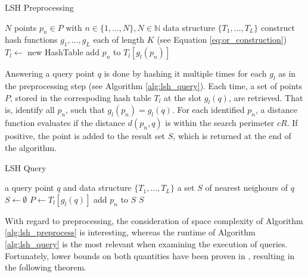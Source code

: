 \begin{algorithm}
    \caption{LSH Preprocessing}
    \label{alg:lsh_preprocess}
    \begin{algorithmic}[1]
        \REQUIRE $N$ points $p_n \in P$ with $n \in \{1, \dots, N\}, N \in \mathbb{N}$
        \ENSURE data structure $\{T_1, \dots, T_L\}$
        \STATE construct hash functions $g_1, \dots, g_L$ each of length $K$ (see Equation \ref{eq:or_construction})
            \STATE $T_l \leftarrow$ new HashTable
                \STATE add $p_n$ to $T_l[g_l(p_n)]$
            \ENDFOR
        \ENDFOR
    \end{algorithmic}
 \end{algorithm}

 Answering a query point $q$ is done by hashing it multiple times for each $g_l$ as in the preprocessing step (see Algorithm \ref{alg:lsh_query}). Each time, a set of points $P$, stored in the correspoding hash table $T_l$ at the slot $g_l(q)$, are retrieved. That is, identify all $p_n$, such that $g_l(p_n) = g_l(q)$. For each identified $p_n$, a distance function evaluates if the distance $d(p_n, q)$ is within the search perimeter $cR$. If positive, the point is added to the result set $S$, which is returned at the end of the algorithm.

 \begin{algorithm}
    \caption{LSH Query}
    \label{alg:lsh_query}
    \begin{algorithmic}[1]
        \REQUIRE a query point $q$ and data structure $\{T_1, \dots, T_L\}$
        \ENSURE a set $S$ of nearest neighours of $q$
        \STATE $S \leftarrow \emptyset$
            \STATE $P \leftarrow T_l[g_l(q)]$
                        \STATE add $p_n$ to $S$
                    \ENDIF
                \ENDFOR
            \ENDIF
        \ENDFOR
        \RETURN $S$
    \end{algorithmic}
 \end{algorithm}

 With regard to preprocessing, the consideration of space complexity of Algorithm \ref{alg:lsh_preprocess} is interesting, whereas the runtime of Algorithm \ref{alg:lsh_query} is the most relevant when examining the execution of queries. Fortunately, lower bounds on both quantities have been proven in \cite{motwani2006lower}, resulting in the following theorem.

